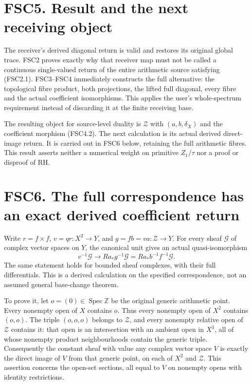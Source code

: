 \section{FSC5. Result and the next receiving
object}\label{fsc5.-result-and-the-next-receiving-object}

The receiver's derived diagonal return is valid and restores its
original global trace. FSC2 proves exactly why that receiver map must
not be called a continuous single-valued return of the entire arithmetic
source satisfying (FSC2.1). FSC3--FSC4 immediately constructs the full
alternative: the topological fibre product, both projections, the lifted
full diagonal, every fibre and the actual coefficient isomorphisms. This
applies the user's whole-spectrum requirement instead of discarding it
at the finite receiving base.

The resulting object for source-level duality is \(\mathcal Z\) with
\((a,b,\delta_X)\) and the coefficient morphism (FSC4.2). The next
calculation is its actual derived direct-image return. It is carried out
in FSC6 below, retaining the full arithmetic fibres. This result asserts
neither a numerical weight on primitive \(Z_1/\tau\) nor a proof or
disproof of RH.

\section{FSC6. The full correspondence has an exact derived coefficient
return}\label{fsc6.-the-full-correspondence-has-an-exact-derived-coefficient-return}

Write \(r=f\times f\), \(v=qr:X^2\to Y\), and
\(g=fb=va:\mathcal Z\to Y\). For every sheaf \(\mathcal G\) of complex
vector spaces on \(Y\), the canonical unit gives an actual
quasi-isomorphism \[
\boxed{v^{-1}\mathcal G\longrightarrow Ra_*g^{-1}\mathcal G
=Ra_*b^{-1}f^{-1}\mathcal G.}
\tag{FSC6.1}
\] The same statement holds for bounded sheaf complexes, with their full
differentials. This is a derived calculation on the specified
correspondence, not an assumed general base-change theorem.

To prove it, let \(o=(0)\in\operatorname{Spec}\mathbb Z\) be the
original generic arithmetic point. Every nonempty open of \(X\) contains
\(o\). Thus every nonempty open of \(X^2\) contains \((o,o)\). The
triple \((o,o,o)\) belongs to \(\mathcal Z\), and every nonempty
relative open of \(\mathcal Z\) contains it: that open is an
intersection with an ambient open in \(X^3\), all of whose nonempty
product neighbourhoods contain the generic triple. Consequently the
constant sheaf with value any complex vector space \(V\) is exactly the
direct image of \(V\) from that generic point, on each of \(X^2\) and
\(\mathcal Z\). This assertion concerns the open-set sections, all equal
to \(V\) on nonempty opens with identity restrictions.


